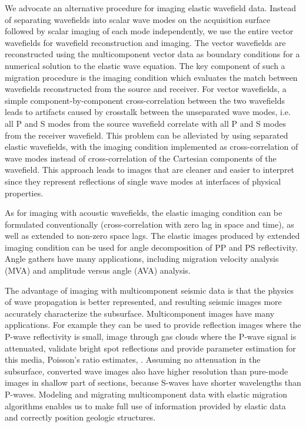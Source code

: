 We advocate an alternative procedure for imaging elastic wavefield
data. Instead of separating wavefields into scalar wave modes on the
acquisition surface followed by scalar imaging of each mode
independently, we use the entire vector wavefields for wavefield
reconstruction and imaging.  The vector wavefields are reconstructed
using the multicomponent vector data as boundary conditions for a
numerical solution to the elastic wave equation. The key component of
such a migration procedure is the imaging condition which evaluates
the match between wavefields reconstructed from the source and
receiver. For vector wavefields, a simple component-by-component
cross-correlation between the two wavefields leads to artifacts caused
by crosstalk between the unseparated wave modes, i.e. all P and S
modes from the source wavefield correlate with all P and S modes from
the receiver wavefield. This problem can be alleviated by using
separated elastic wavefields, with the imaging condition implemented
as cross-correlation of wave modes instead of cross-correlation of the
Cartesian components of the wavefield. This approach leads to images
that are cleaner and easier to interpret since they represent
reflections of single wave modes at interfaces of physical properties.

As for imaging with acoustic wavefields, the elastic imaging condition
can be formulated conventionally (cross-correlation with zero lag in
space and time), as well as extended to non-zero space lags. The
elastic images produced by extended imaging condition can be used for
angle decomposition of PP and PS reflectivity. Angle gathers have many
applications, including migration velocity analysis (MVA) and
amplitude versus angle (AVA) analysis.

The advantage of imaging with multicomponent seismic data is that the
physics of wave propagation is better represented, and resulting
seismic images more accurately characterize the subsurface.
Multicomponent images have many applications. For example they can be
used to provide reflection images where the P-wave reflectivity is
small, image through gas clouds where the P-wave signal is attenuated,
 validate bright
spot reflections and provide parameter estimation for this media,
 Poisson's ratio estimates, 
\cite[]{li:2056,zhu:1283,knapp:776,gaiser:974,stewart:40,simmons:1227}.
Assuming no attenuation in the subsurface, converted wave images also
have higher resolution than pure-mode images in shallow part of
sections, because S-waves have shorter wavelengths than P-waves.
Modeling and migrating multicomponent data with elastic migration
algorithms enables us to make full use of information provided by
elastic data and correctly position geologic structures.

